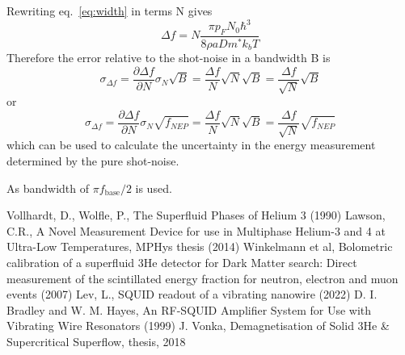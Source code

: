 \documentclass[a4paper,12pt]{article}
\begin{document}
Rewriting eq.~\ref{eq:width} in terms N gives
\begin{equation}
  \Delta f = N \frac{\pi p_F N_0 \hbar^3}{8 \rho a D m^* k_b T}
\end{equation}
Therefore the error relative to the shot-noise in a bandwidth B is
\begin{equation}
  \sigma_{\Delta f} = \frac{\partial \Delta f}{\partial N} \sigma_N \sqrt{B} = \frac{\Delta f}{N}\sqrt{N} \sqrt{B} = \frac{\Delta f}{\sqrt{N}} \sqrt{B}
\end{equation}
or
\begin{equation}
  \sigma_{\Delta f} = \frac{\partial \Delta f}{\partial N} \sigma_N \sqrt{f_{NEP}} = \frac{\Delta f}{N}\sqrt{N} \sqrt{B} = \frac{\Delta f}{\sqrt{N}} \sqrt{f_{NEP}}
\end{equation}
which can be used to calculate the uncertainty in the energy measurement determined by the pure shot-noise.

As bandwidth of $\pi f_\mathrm{base}/2$ is used.


\pagebreak
\newpage

\begin{thebibliography}{9}

 Vollhardt, D., Wolfle, P., The Superfluid Phases of Helium 3 (1990)
 Lawson, C.R., A Novel Measurement Device for use in Multiphase Helium-3 and 4 at Ultra-Low Temperatures, MPHys thesis (2014)
 Winkelmann et al, Bolometric calibration of a superfluid 3He detector for Dark Matter search: Direct measurement of the scintillated energy fraction for
neutron, electron and muon events (2007)
 Lev, L., SQUID readout of a vibrating nanowire (2022)
 D. I. Bradley and W. M. Hayes, An RF-SQUID Amplifier System for Use with Vibrating Wire Resonators (1999)
 J. Vonka, Demagnetisation of Solid 3He \& Supercritical Superflow, thesis, 2018
\end{thebibliography}
\end{document}
